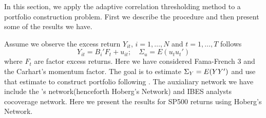 In this section, we apply the adaptive correlation thresholding method to a portfolio construction problem. First we describe the procedure and then present some of the results we have. 

Assume we observe the excess return \(Y_{it}\), \(i = 1,\dots,N\) and \(t= 1,\dots, T\) follows
\begin{equation*}
    Y_{it} = B_{i}' F_{t} + u_{it} ; \quad \Sigma_{u} = E(u_{t}u_{t}')
\end{equation*}
where \(F_{t}\) are factor excess returns. Here we have considered Fama-French 3 and the Carhart's momentum factor. The goal is to estimate \(\Sigma_{Y} = E\pqty{YY'}\) and use that estimate to construct portfolio following \cite{ledoit2017NonlinearShrinkage}. The auxialiary network we have include the \cite{hoberg2016TextBasedNetwork}'s network(henceforth Hoberg's Network) and IBES analysts cocoverage network. Here we present the results for SP500 returns using Hoberg's Network. 

